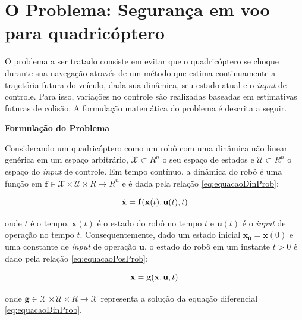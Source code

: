 \documentclass[a4paper, 12pt]{article}
\begin{document}
\newpage

\section{O Problema: Segurança em voo para quadricóptero}
\label{sec:prob}

O problema a ser tratado consiste em evitar que o quadricóptero se choque durante sua navegação através de um método que estima continuamente a trajetória futura do veículo, dada sua dinâmica, seu estado atual e o \textit{input} de controle. Para isso, variações no controle são realizadas baseadas em estimativas futuras de colisão. A formulação matemática do problema é descrita a seguir.



\noindent\textbf{Formulação do Problema}

Considerando um quadricóptero como um robô com uma dinâmica não linear genérica em um espaço arbitrário, $\mathcal{X} \subset R^{n}$ o seu espaço de estados e $\mathcal{U} \subset R^{n}$ o espaço do \textit{input} de controle. Em tempo contínuo, a dinâmica do robô é uma função em $\mathbf{f} \in \mathcal{X} \times \mathcal{U} \times R \rightarrow R^{n}$ e é dada pela relação \ref{eq:equacaoDinProb}:

\begin{equation}
\centering
\dot{\mathbf{x}} = \mathbf{f}(\mathbf{x}(t),\mathbf{u}(t),t)  
\label{eq:equacaoDinProb}
\end{equation}

\noindent onde $t$ é o tempo, $\mathbf{x}(t)$ é o estado do robô no tempo $t$ e $\mathbf{u}(t)$ é o \textit{input} de operação no tempo $t$. Consequentemente, dado um estado inicial $\mathbf{x_0} = \mathbf{x}(0)$ e uma constante de \textit{input} de operação $\mathbf{u}$, o estado do robô em um instante $t > 0$ é dado pela relação \ref{eq:equacaoPosProb}:
 

\begin{equation}
\centering
\mathbf{x} = \mathbf{g}(\mathbf{x},\mathbf{u},t)  
\label{eq:equacaoPosProb}
\end{equation}

\noindent onde $\mathbf{g} \in \mathcal{X} \times \mathcal{U} \times R \rightarrow \mathcal{X}$ representa a solução da equação diferencial \ref{eq:equacaoDinProb}.
\end{document}
